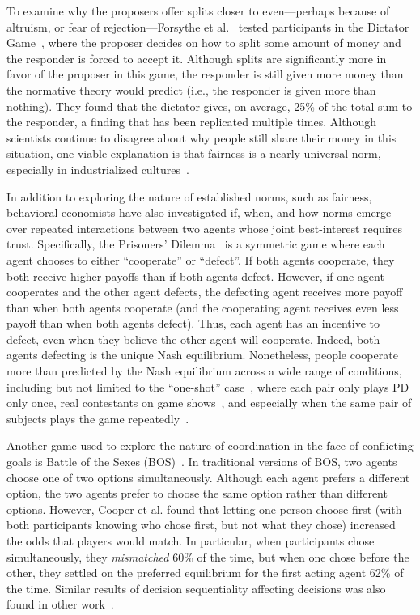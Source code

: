 To examine why the proposers offer splits closer to even---perhaps
because of altruism, or fear of rejection---Forsythe et
al.~\cite{forsythe94} tested participants in the Dictator
Game~\cite{kahneman86}, where the proposer decides on how to split
some amount of money and the responder is forced to accept
it. Although splits are significantly more in favor of the proposer in
this game, the responder is still given more money than the normative
theory would predict (i.e., the responder is given more than
nothing). They found that the dictator gives, on average, 25\% of the
total sum to the responder, a finding that has been replicated
multiple times. Although scientists continue to disagree about why
people still share their money in this situation,
one viable explanation is that fairness is a nearly universal norm,
especially in industrialized cultures~\cite{henrich05}.

In addition to exploring the nature of established norms, such as
fairness, behavioral economists have also investigated if, when, and
how norms emerge over repeated interactions between two agents whose
joint best-interest requires trust. Specifically, the Prisoners'
Dilemma~\cite{luce57} is a symmetric game where each agent chooses to
either ``cooperate'' or ``defect''. If both agents cooperate, they
both receive higher payoffs than if both agents defect. However, if
one agent cooperates and the other agent defects, the defecting agent
receives more payoff than when both agents cooperate (and the
cooperating agent receives even less payoff than when both agents
defect). Thus, each agent has an incentive to defect, even when they
believe the other agent will cooperate. Indeed, both agents defecting
is the unique Nash equilibrium. Nonetheless, people cooperate more
than predicted by the Nash equilibrium across a wide range of
conditions, including but not limited to the ``one-shot''
case~\cite{rapoport88}, where each pair only plays PD only once, real
contestants on game shows~\cite{list06}, and especially when the same
pair of subjects plays the game repeatedly~\cite{rand13,sally95}.

Another game used to explore the nature of coordination in the face of
conflicting goals is Battle of the Sexes (BOS)~\cite{luce57}. In
traditional versions of BOS, two agents choose one of two options
simultaneously. Although each agent prefers a different option, the
two agents prefer to choose the same option rather than different options.
However, Cooper et al.\cite{cooper94} found that letting
one person choose first (with both participants knowing who
chose first, but not what they chose) increased the odds
that players would match. In particular, when participants
chose simultaneously, they {\em mismatched} 60\% of the time,
but when one chose before the other, they settled on the 
preferred equilibrium for the first acting agent 62\% of the time.
Similar results of decision sequentiality affecting decisions
was also found in other work~\cite{rapoport97,ho96}.


